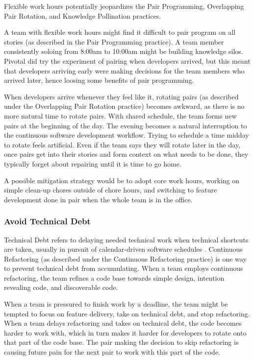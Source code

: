 \begin{table}[]
Flexible work hours potentially jeopardizes the Pair Programming, Overlapping Pair Rotation, and Knowledge Pollination practices. 

A team with flexible work hours might find it difficult to pair program on all stories (as described in the Pair Programming practice). A team member consistently soloing from 8:00am to 10:00am might be building knowledge silos. Pivotal did try the experiment of pairing when developers arrived, but this meant that developers arriving early were making decisions for the team members who arrived later, hence loosing some benefits of pair programming. 

When developers arrive whenever they feel like it, rotating pairs (as described under the Overlapping Pair Rotation practice) becomes awkward, as there is no more natural time to rotate pairs. With shared schedule, the team forms new pairs at the beginning of the day. The evening becomes a natural interruption to the continuous software development workflow. Trying to schedule a time midday to rotate feels artificial. Even if the team says they will rotate later in the day, once pairs get into their stories and form context on what needs to be done, they typically forget about repairing until it is time to go home.

A possible mitigation strategy would be to adopt core work hours, working on simple clean-up chores outside of chore hours, and switching to feature development done in pair when the whole team is in the office. 

\subsubsection{Avoid Technical Debt}

Technical Debt refers to delaying needed technical work when technical shortcuts are taken, usually in pursuit of calendar-driven software schedules \cite{McConnellTechnicalDebt}.  Continuous Refactoring (as described under the Continuous Refactoring practice) is one way to prevent technical debt from accumulating. When a team employs continuous refactoring, the team refines a code base towards simple design, intention revealing code, and discoverable code. 

When a team is pressured to finish work by a deadline, the team might be tempted to focus on feature delivery, take on technical debt, and stop refactoring. When a team delays refactoring and takes on technical debt, the code becomes harder to work with, which in turn makes it harder for developers to rotate onto that part of the code base. The pair making the decision to skip refactoring is causing future pain for the next pair to work with this part of the code. 


\end{table}
